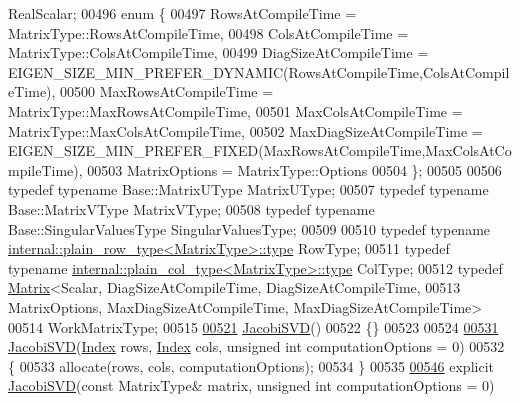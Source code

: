 \begin{DoxyCode}
       RealScalar;
00496     \textcolor{keyword}{enum} \{
00497       RowsAtCompileTime = MatrixType::RowsAtCompileTime,
00498       ColsAtCompileTime = MatrixType::ColsAtCompileTime,
00499       DiagSizeAtCompileTime = EIGEN\_SIZE\_MIN\_PREFER\_DYNAMIC(RowsAtCompileTime,ColsAtCompileTime),
00500       MaxRowsAtCompileTime = MatrixType::MaxRowsAtCompileTime,
00501       MaxColsAtCompileTime = MatrixType::MaxColsAtCompileTime,
00502       MaxDiagSizeAtCompileTime = EIGEN\_SIZE\_MIN\_PREFER\_FIXED(MaxRowsAtCompileTime,MaxColsAtCompileTime),
00503       MatrixOptions = MatrixType::Options
00504     \};
00505 
00506     \textcolor{keyword}{typedef} \textcolor{keyword}{typename} Base::MatrixUType MatrixUType;
00507     \textcolor{keyword}{typedef} \textcolor{keyword}{typename} Base::MatrixVType MatrixVType;
00508     \textcolor{keyword}{typedef} \textcolor{keyword}{typename} Base::SingularValuesType SingularValuesType;
00509     
00510     \textcolor{keyword}{typedef} \textcolor{keyword}{typename} \hyperlink{class_eigen_1_1internal_1_1_tensor_lazy_evaluator_writable}{internal::plain\_row\_type<MatrixType>::type} 
      RowType;
00511     \textcolor{keyword}{typedef} \textcolor{keyword}{typename} \hyperlink{class_eigen_1_1internal_1_1_tensor_lazy_evaluator_writable}{internal::plain\_col\_type<MatrixType>::type} 
      ColType;
00512     \textcolor{keyword}{typedef} \hyperlink{group___core___module_class_eigen_1_1_matrix}{Matrix}<Scalar, DiagSizeAtCompileTime, DiagSizeAtCompileTime,
00513                    MatrixOptions, MaxDiagSizeAtCompileTime, MaxDiagSizeAtCompileTime>
00514             WorkMatrixType;
00515 
\hyperlink{group___s_v_d___module_a55315ab9cd060019a5ad07be798ff3b9}{00521}     \hyperlink{group___s_v_d___module_a55315ab9cd060019a5ad07be798ff3b9}{JacobiSVD}()
00522     \{\}
00523 
00524 
\hyperlink{group___s_v_d___module_a5d9ea7c8f361337727260efd77ee03ac}{00531}     \hyperlink{group___s_v_d___module_a5d9ea7c8f361337727260efd77ee03ac}{JacobiSVD}(\hyperlink{group___s_v_d___module_a6229a37997eca1072b52cca5ee7a2bec}{Index} rows, \hyperlink{group___s_v_d___module_a6229a37997eca1072b52cca5ee7a2bec}{Index} cols, \textcolor{keywordtype}{unsigned} \textcolor{keywordtype}{int} computationOptions = 0)
00532     \{
00533       allocate(rows, cols, computationOptions);
00534     \}
00535 
\hyperlink{group___s_v_d___module_abfd1dd454a6e3edec7feecd97c818a78}{00546}     \textcolor{keyword}{explicit} \hyperlink{group___s_v_d___module_abfd1dd454a6e3edec7feecd97c818a78}{JacobiSVD}(\textcolor{keyword}{const} MatrixType& matrix, \textcolor{keywordtype}{unsigned} \textcolor{keywordtype}{int} computationOptions = 0)

\end{DoxyCode}
